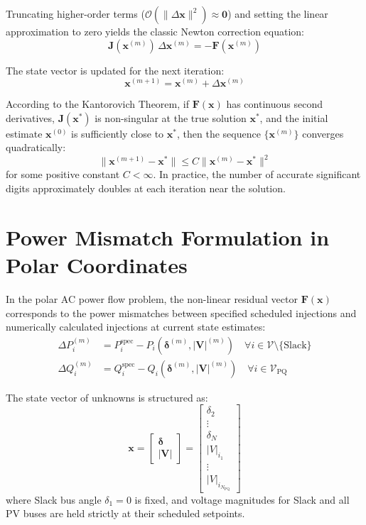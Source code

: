 \documentclass[12pt,a4paper,oneside]{report}
\begin{document}
Truncating higher-order terms ($\mathcal{O}(\|\Delta \mathbf{x}\|^2) \approx \mathbf{0}$) and setting the linear approximation to zero yields the classic Newton correction equation:
\begin{equation}
\mathbf{J}(\mathbf{x}^{(m)}) \, \Delta \mathbf{x}^{(m)} = -\mathbf{F}(\mathbf{x}^{(m)})
\end{equation}

The state vector is updated for the next iteration:
\begin{equation}
\mathbf{x}^{(m+1)} = \mathbf{x}^{(m)} + \Delta \mathbf{x}^{(m)}
\end{equation}

According to the Kantorovich Theorem, if $\mathbf{F}(\mathbf{x})$ has continuous second derivatives, $\mathbf{J}(\mathbf{x}^*)$ is non-singular at the true solution $\mathbf{x}^*$, and the initial estimate $\mathbf{x}^{(0)}$ is sufficiently close to $\mathbf{x}^*$, then the sequence $\{\mathbf{x}^{(m)}\}$ converges quadratically:
\begin{equation}
\|\mathbf{x}^{(m+1)} - \mathbf{x}^*\| \le C \|\mathbf{x}^{(m)} - \mathbf{x}^*\|^2
\end{equation}
for some positive constant $C < \infty$. In practice, the number of accurate significant digits approximately doubles at each iteration near the solution.

\section{Power Mismatch Formulation in Polar Coordinates}
In the polar AC power flow problem, the non-linear residual vector $\mathbf{F}(\mathbf{x})$ corresponds to the power mismatches between specified scheduled injections and numerically calculated injections at current state estimates:
\begin{align}
\Delta P_i^{(m)} &= P_i^{\text{spec}} - P_i(\boldsymbol{\delta}^{(m)}, |\mathbf{V}|^{(m)}) \quad \forall i \in \mathcal{V} \setminus \{\text{Slack}\} \\
\Delta Q_i^{(m)} &= Q_i^{\text{spec}} - Q_i(\boldsymbol{\delta}^{(m)}, |\mathbf{V}|^{(m)}) \quad \forall i \in \mathcal{V}_{\text{PQ}}
\end{align}

The state vector of unknowns is structured as:
\begin{equation}
\mathbf{x} = \begin{bmatrix} \boldsymbol{\delta} \\ |\mathbf{V}| \end{bmatrix} = \begin{bmatrix}
\delta_2 \\ \vdots \\ \delta_N \\ |V|_{i_1} \\ \vdots \\ |V|_{i_{N_{\text{PQ}}}}
\end{bmatrix}
\end{equation}
where Slack bus angle $\delta_1 = 0$ is fixed, and voltage magnitudes for Slack and all PV buses are held strictly at their scheduled setpoints.
\end{document}

